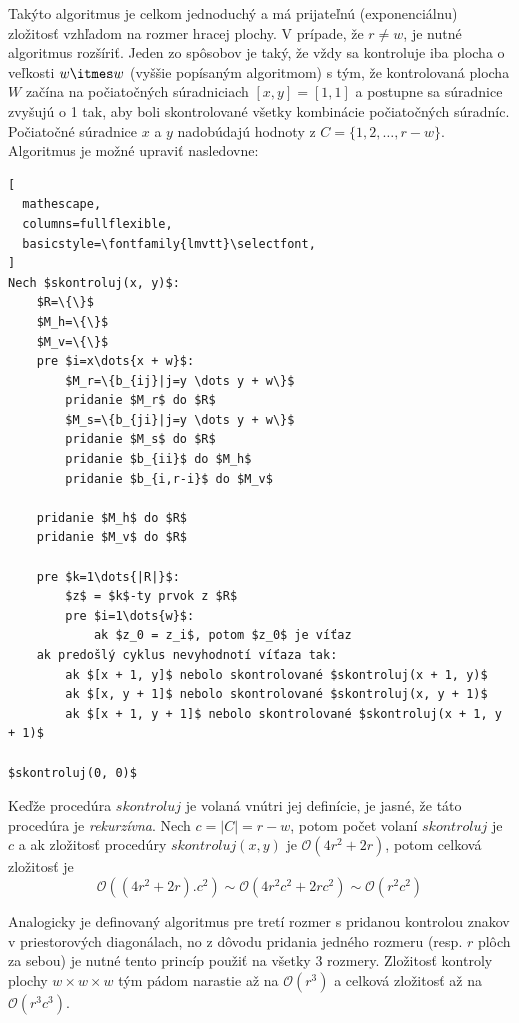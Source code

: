 Takýto algoritmus je celkom jednoduchý a má prijateľnú (exponenciálnu) zložitosť vzhľadom na rozmer hracej plochy.
V prípade, že $r \neq w$, je nutné algoritmus rozšíriť.
Jeden zo spôsobov je taký, že vždy sa kontroluje iba plocha o veľkosti $w \itmes w$ (vyššie popísaným algoritmom) s
tým, že kontrolovaná plocha $W$ začína na počiatočných súradniciach $[x,y]=[1,1]$ a postupne sa súradnice zvyšujú o 1
tak, aby boli skontrolované všetky kombinácie počiatočných súradníc.
Počiatočné súradnice $x$ a $y$ nadobúdajú hodnoty z $C = \{1, 2, \dots, r - w\}$.
Algoritmus je možné upraviť nasledovne:
\begin{lstlisting}[
  mathescape,
  columns=fullflexible,
  basicstyle=\fontfamily{lmvtt}\selectfont,
]
Nech $skontroluj(x, y)$:
    $R=\{\}$
    $M_h=\{\}$
    $M_v=\{\}$
    pre $i=x\dots{x + w}$:
        $M_r=\{b_{ij}|j=y \dots y + w\}$
        pridanie $M_r$ do $R$
        $M_s=\{b_{ji}|j=y \dots y + w\}$
        pridanie $M_s$ do $R$
        pridanie $b_{ii}$ do $M_h$
        pridanie $b_{i,r-i}$ do $M_v$

    pridanie $M_h$ do $R$
    pridanie $M_v$ do $R$

    pre $k=1\dots{|R|}$:
        $z$ = $k$-ty prvok z $R$
        pre $i=1\dots{w}$:
            ak $z_0 = z_i$, potom $z_0$ je víťaz
    ak predošlý cyklus nevyhodnotí víťaza tak:
        ak $[x + 1, y]$ nebolo skontrolované $skontroluj(x + 1, y)$
        ak $[x, y + 1]$ nebolo skontrolované $skontroluj(x, y + 1)$
        ak $[x + 1, y + 1]$ nebolo skontrolované $skontroluj(x + 1, y + 1)$

$skontroluj(0, 0)$
\end{lstlisting}
Keďže procedúra $skontroluj$ je volaná vnútri jej definície, je jasné, že táto procedúra je \emph{rekurzívna}.
Nech $c = |C| = r - w$, potom počet volaní $skontroluj$ je $c$ a ak zložitosť procedúry $skontroluj(x, y)$ je
$\mathcal{O}(4r^2 + 2r)$, potom celková zložitosť je
\begin{equation}
    \mathcal{O}((4r^2 + 2r).c^2) \sim \mathcal{O}(4r^2c^2 + 2rc^2) \sim \mathcal{O}(r^2c^2)
\end{equation}

Analogicky je definovaný algoritmus pre tretí rozmer s pridanou kontrolou znakov v priestorových diagonálach, no
z dôvodu pridania jedného rozmeru (resp. $r$ plôch za sebou) je nutné tento princíp použiť na všetky 3 rozmery.
Zložitosť kontroly plochy $w \times w \times w$ tým pádom narastie až na $\mathcal{O}(r^3)$ a celková zložitosť až na
$\mathcal{O}(r^3c^3)$.
